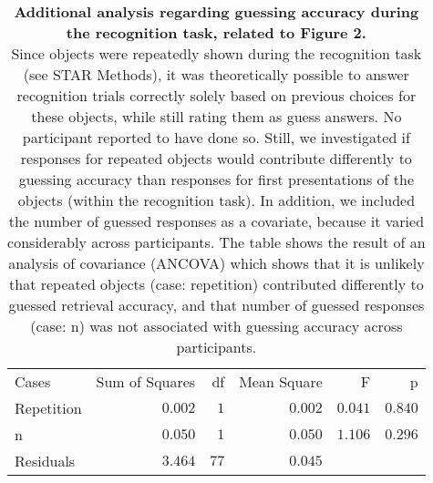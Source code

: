 \begin{table}[ht]
	
	\label{tab:aNCOVA-Mean_acc_bysub}
	{
		\begin{tabular}{lrrrrr}
			\toprule
			Cases & Sum of Squares & df & Mean Square & F & p  \\
			\cmidrule[0.4pt]{1-6}
			Repetition & $0.002$ & $1$ & $0.002$ & $0.041$ & $0.840$  \\
			n & $0.050$ & $1$ & $0.050$ & $1.106$ & $0.296$  \\
			Residuals & $3.464$ & $77$ & $0.045$ & ~ & ~  \\
			\bottomrule
		\end{tabular}
        \vspace{1em}
        \caption{\textbf{Additional analysis regarding guessing accuracy during the recognition task, related to Figure 2.}\\ 
        Since objects were repeatedly shown during the recognition task (see STAR Methods), it was theoretically possible to answer recognition trials correctly solely based on previous choices for these objects, while still rating them as guess answers. No participant reported to have done so. Still, we investigated if responses for repeated objects would contribute differently to guessing accuracy than responses for first presentations of the objects (within the recognition task). In addition, we included the number of guessed responses as a covariate, because it varied considerably across participants.
        The table shows the result of an analysis of covariance (ANCOVA) which shows that it is unlikely that repeated objects (case: repetition) contributed differently to guessed retrieval accuracy, and that number of guessed responses (case: n) was not associated with guessing accuracy across participants.}
	}
\end{table}

